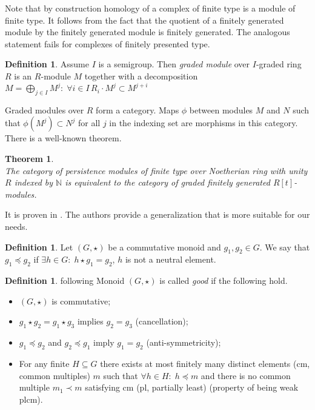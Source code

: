 \documentclass[a4paper, 12pt]{article}
\newcounter{stmcounter}[section]
\newcounter{thcounter}
\numberwithin{equation}{section}
\newtheorem{theorem}[thcounter]{Theorem}
\theoremstyle{definition}
\newtheorem{definition}[stmcounter]{Definition}
\theoremstyle{remark}
\newcommand{\define}[1]{{\textit{#1}}}
\begin{document}
Note that by construction homology of a complex of finite type is a module of finite type. It follows from the fact that the quotient of a finitely generated module by the finitely generated module is finitely generated. The analogous statement fails for complexes of finitely presented type.\\

\begin{definition}
  Assume $I$ is a semigroup. Then \define{graded module} over $I$-graded ring $R$ is an $R$-module $M$ together with a decomposition $M = \bigoplus_{j \in I} M^j:\; \forall i \in I\, R_i \cdot M^j \subset M^{j+i}$
\end{definition}

Graded modules over $R$ form a category. Maps $\phi$ between modules $M$ and $N$ such that $\phi(M^j) \subset N^j$ for all $j$ in the indexing set are morphisms in this category.\\

There is a well-known theorem.

\begin{theorem} {\cite[Theorem 3.1]{Zomorodian05}}\\
  The category of persistence modules of finite type over Noetherian ring with unity $R$ indexed by $\mathbb{N}$ is equivalent to the category of graded finitely generated $R[t]$-modules.
\end{theorem}

It is proven in {\cite{Corbet18}}. The authors provide a generalization that is more suitable for our needs.\\

\begin{definition}
  Let $(G,\star)$ be a commutative monoid and $g_1, g_2 \in G$.
  We say that $g_1 \preceq g_2$ if $\exists h \in G:\; h \star g_1 = g_2$, $h$ is not a neutral element.
\end{definition}

\begin{definition} {following \cite[Definition 11]{Corbet18}}
  Monoid $(G,\star)$ is called \define{good} if the following hold.
  \begin{itemize}
    \item $(G, \star)$ is commutative;
    \item $g_1 \star g_2 = g_1 \star g_3$ implies $g_2 = g_3$ (cancellation);
    \item $g_1 \preceq g_2$ and $g_2 \preceq g_1$ imply $g_1 = g_2$ (anti-symmetricity);
    \item For any finite $H \subseteq G$ there exists at most finitely many distinct elements (cm, common multiples) $m$ such that $\forall h \in H:\; h \preceq m$ and there is no common multiple $m_1 \prec m$ satisfying cm (pl, partially least) (property of being weak plcm).
  \end{itemize}
\end{definition}
\end{document}
